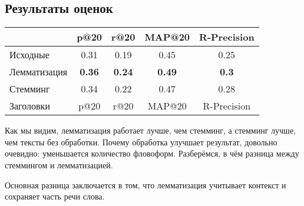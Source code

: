 \subsection{Результаты оценок}

\begin{center}
	\begin{tabular}{l|cccc}
		& p@20 & r@20 & MAP@20 & R-Precision\\
		\hline
		Исходные & 0.31 & 0.19 & 0.45 & 0.25\\
		Лемматизация & {\bf 0.36} & {\bf 0.24} & {\bf 0.49} & {\bf 0.3}\\
		Стемминг & 0.34 & 0.22 & 0.47 & 0.28 \\
		Заголовки & p@20 & r@20 & MAP@20 & R-Precision\\
	\end{tabular}
\end{center}

Как мы видим, лемматизация работает лучше, чем стемминг, а стемминг лучше, чем тексты без обработки. 
Почему обработка улучшает результат, довольно очевидно: уменьшается количество фловоформ. Разберёмся, в чём разница между стеммингом и лемматизацией.

Основная разница заключается в том, что лемматизация учитывает контекст и сохраняет часть речи слова. 
